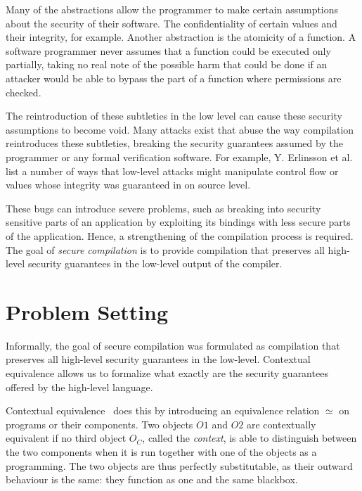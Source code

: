\documentclass[11pt]{article}
\begin{document}
Many of the abstractions allow the programmer to make certain assumptions about the security of their software.
The confidentiality of certain values and their integrity, for example.
Another abstraction is the atomicity of a function.
A software programmer never assumes that a function could be executed only partially, taking no real note of the possible harm that could be done if an attacker would be able to bypass the part of a function where permissions are checked.

The reintroduction of these subtleties in the low level can cause these security assumptions to become void.
Many attacks exist that abuse the way compilation reintroduces these subtleties, breaking the security guarantees assumed by the programmer or any formal verification software.
For example, Y. Erlinsson et al.~\cite{OVSPaper} list a number of ways that low-level attacks might manipulate control flow or values whose integrity was guaranteed in on source level.

These bugs can introduce severe problems, such as breaking into security sensitive parts of an application by exploiting its bindings with less secure parts of the application.
Hence, a strengthening of the compilation process is required.
The goal of \emph{secure compilation} is to provide compilation that preserves all high-level security guarantees in the low-level output of the compiler.

\section{Problem Setting}
Informally, the goal of secure compilation was formulated as compilation that preserves all high-level security guarantees in the low-level.
Contextual equivalence allows us to formalize what exactly are the security guarantees offered by the high-level language.

Contextual equivalence~\cite{Agten:2012:SCM:2354412.2355247} does this by introducing an equivalence relation $\simeq$ on programs or their components.
Two objects $O1$ and $O2$ are contextually equivalent if no third object $O_C$, called the \emph{context}, is able to distinguish between the two components when it is run together with one of the objects as a programming.
The two objects are thus perfectly substitutable, as their outward behaviour is the same: they function as one and the same blackbox.
\end{document}
